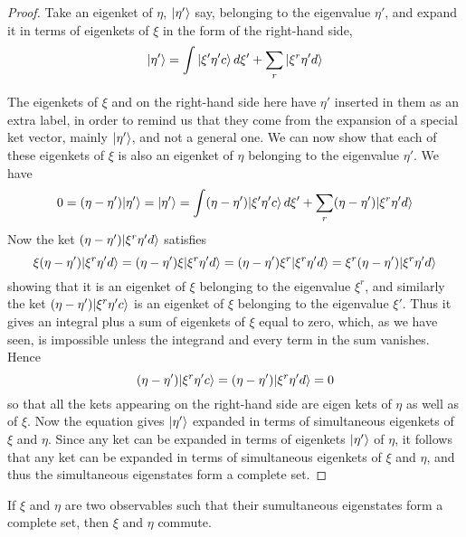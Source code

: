 \begin{proof}
Take an eigenket of $\eta$, $| \eta' \rangle$ say, belonging to the eigenvalue $\eta'$, and expand it in terms of eigenkets of $\xi$ in the form of the right-hand side,
\begin{equation}
| \eta' \rangle = \int | \xi'\eta'c \rangle \, d\xi'  + \sum_r | \xi^r \eta' d \rangle
\end{equation}

The eigenkets of $\xi$ and on the right-hand side here have $\eta'$ inserted in them as an extra label, in order to remind us that they come from the expansion of a special ket vector, mainly $| \eta' \rangle$, and not a general one. We can now show that each of these eigenkets of $\xi$ is also an eigenket of $\eta$ belonging to the eigenvalue $\eta'$. We have
\begin{equation}
0 = (\eta - \eta') | \eta' \rangle = | \eta' \rangle = \int(\eta - \eta')| \xi'\eta'c \rangle \, d\xi'  + \sum_r(\eta - \eta') | \xi^r \eta' d \rangle
\end{equation}
Now the ket $(\eta - \eta') | \xi^r \eta' d \rangle$ satisfies
\begin{equation}
\xi (\eta - \eta') | \xi^r \eta' d \rangle = (\eta - \eta') \xi | \xi^r \eta' d \rangle
=(\eta - \eta') \xi^r | \xi^r \eta' d \rangle = \xi^r (\eta - \eta') | \xi^r \eta' d \rangle
\end{equation}
showing that it is an eigenket of $\xi$ belonging to the eigenvalue $\xi^r$, and similarly the ket $(\eta - \eta') | \xi^r \eta' c \rangle$ is an eigenket of $\xi$ belonging to the eigenvalue $\xi'$. Thus it gives an integral plus a sum of eigenkets of $\xi$ equal to zero, which, as we have seen, is impossible unless the integrand and every term in the sum vanishes. Hence
\begin{equation}
(\eta - \eta') | \xi^r \eta' c \rangle = (\eta - \eta') | \xi^r \eta' d \rangle = 0
\end{equation}
so that all the kets appearing on the right-hand side are eigen kets of $\eta$ as well as of $\xi$. Now the equation gives $| \eta' \rangle$ expanded in terms of simultaneous eigenkets of $\xi$ and $\eta$. Since any ket can be expanded in terms of eigenkets $| \eta' \rangle$ of $\eta$, it follows that any ket can be expanded in terms of simultaneous eigenkets of $\xi$ and $\eta$, and thus the simultaneous eigenstates form a complete set.
\end{proof}

\begin{theorem}
If $\xi$ and $\eta$ are two observables such that their sumultaneous eigenstates form a complete set, then $\xi$ and $\eta$ commute.
\end{theorem}

